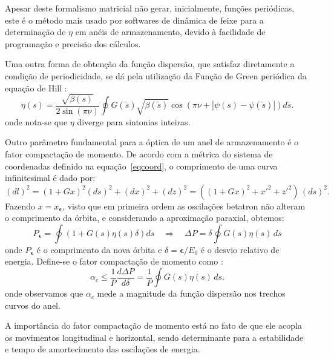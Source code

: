 Apesar deste formalismo matricial não gerar, inicialmente, funções periódicas, este é o método mais usado por softwares de dinâmica de feixe para a determinação de $\eta$ em anéis de armazenamento, devido à facilidade de programação e precisão dos cálculos.

Uma outra forma de obtenção da função dispersão, que satisfaz diretamente a condição de periodicidade, se dá pela utilização da Função de Green periódica da equação de Hill \cite{Lee}:
\begin{equation}
 \eta(s) =  \frac{\sqrt{\beta(s)}}{2\sin(\pi \nu)}\oint G(\tilde{s})
\sqrt{\beta(\tilde{s})} \cos \left(\pi \nu +|\psi(s) - \psi(\tilde{s})|\right)d
\tilde{s}.
\end{equation}
onde nota-se que $\eta$ diverge para sintonias inteiras.

Outro parâmetro fundamental para a óptica de um anel de armazenamento é o fator compactação de momento. De acordo com a métrica do sistema de coordenadas definido na \mbox{equação \ref{eqcoord}}, o comprimento de uma curva infinitesimal é dado por:
\begin{equation}
 (d l)^2 = (1+G x)^2(d s)^2+(d x)^2+(d z)^2 = \left((1+G x)^2+x'^2+
z'^2\right)\,(ds)^2.
\end{equation}
Fazendo $x=x_{\boldsymbol{\epsilon}}$, visto que em primeira ordem as oscilações betatron não alteram o comprimento da órbita, e considerando a aproximação paraxial, obtemos:
\begin{equation}
 P_{\boldsymbol{\epsilon}} = \oint (1+G(s) \eta(s) \delta)ds \quad \Rightarrow
\quad
\Delta P = \delta \oint G(s) \eta(s)\, d s
\end{equation}
onde $P_{\boldsymbol{\epsilon}}$ é o comprimento da nova órbita e $\delta = \boldsymbol{\epsilon} / E_0$ é o desvio relativo de energia. Define-se o fator compactação de momento como \cite{Lee}:
\begin{equation}
 \alpha_c \leq \frac{1}{P} \frac{d \Delta P}{d \delta} = \frac{1}{P}
\oint G(s) \eta(s) \, d s.
\end{equation}
onde observamos que $\alpha_c$ mede a magnitude da função dispersão nos trechos curvos do anel.

A importância do fator compactação de momento está no fato de que ele acopla os movimentos longitudinal e horizontal, sendo determinante para a estabilidade e tempo de amortecimento das oscilações de energia.

